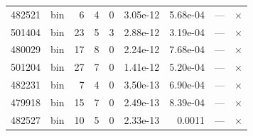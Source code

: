 \begin{longtable}{rlrrrrrrr}
  482521 & bin & 6 & 4 & 0 & 3.05e-12 & 5.68e-04 & --- & $\times$ \\
  501404 & bin & 23 & 5 & 3 & 2.88e-12 & 3.19e-04 & --- & $\times$ \\
  480029 & bin & 17 & 8 & 0 & 2.24e-12 & 7.68e-04 & --- & $\times$ \\
  501204 & bin & 27 & 7 & 0 & 1.41e-12 & 5.20e-04 & --- & $\times$ \\
  482231 & bin & 7 & 4 & 0 & 3.50e-13 & 6.90e-04 & --- & $\times$ \\
  479918 & bin & 15 & 7 & 0 & 2.49e-13 & 8.39e-04 & --- & $\times$ \\
  482527 & bin & 10 & 5 & 0 & 2.33e-13 & 0.0011 & --- & $\times$ \\
\bottomrule
\end{longtable}


